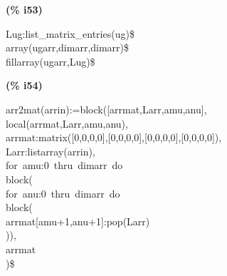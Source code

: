 \documentclass[fleqn]{article}
\begin{document}
\noindent
\begin{minipage}[t]{4.000000em}\color{red}\bfseries
(\% i53)	
\end{minipage}
\begin{minipage}[t]{\textwidth}\color{blue}
Lug:list\_matrix\_entries(ug)\$\\
array(ugarr,dimarr,dimarr)\$\\
fillarray(ugarr,Lug)\$
\end{minipage}

\noindent%



\noindent
\begin{minipage}[t]{4.000000em}\color{red}\bfseries
(\% i54)	
\end{minipage}
\begin{minipage}[t]{\textwidth}\color{blue}
arr2mat(arrin):=block([arrmat,Larr,amu,anu],\\
local(arrmat,Larr,amu,anu),\\
arrmat:matrix([0,0,0,0],[0,0,0,0],[0,0,0,0],[0,0,0,0]),\\
Larr:listarray(arrin),\\
for\ amu:0\ thru\ dimarr\ do\\
block(\\
for\ anu:0\ thru\ dimarr\ do\\
block(\\
arrmat[amu+1,anu+1]:pop(Larr)\\
)),\\
arrmat\\
)\$
\end{minipage}

\noindent%
\end{document}
